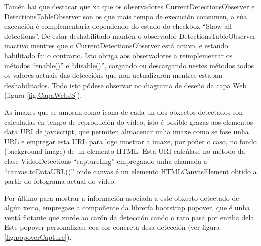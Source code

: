     Tamén hai que destacar que xa que os observadores CurrentDetectionsObserver e 
    DetectionsTableObserver son os que mais tempo de execución consumen, a súa execución é 
    complementaria dependendo do estado do checkbox ``Show all detections''. De estar
    deshabilitado mantén o observador DetectionsTableObserver inactivo mentres que o 
    CurrentDetectionsObserver está activo, e estando habilitado fai o contrario. Isto obriga aos
    observadores a reimplementar os métodos ``enable()'' e ``disable()'', cargando ou
    descargando nestes métodos todos os valores actuais das deteccións que non actualizaron mentres
    estaban deshabilitados. Todo isto pódese observar no diagrama de deseño da capa Web (figura 
    \ref{fig:CapaWebJS}).
    
    
    As imaxes que se amosan como icona de cada un dos obxectos detectados son calculadas en tempo de
    reprodución do vídeo, isto é posible grazas aos elementos data URI\cite{data-uris} de javascript,
    que permiten almacenar unha imaxe como se fose unha URL e empregar esta URL para logo mostrar a 
    imaxe, por poñer o caso, no fondo (background-image) de un elemento HTML. Esta URI calcúlase 
    no método da clase VideoDetections ``captureImg'' empregando unha chamada a ``canvas.toDataURL()''
    onde canvas é un elemento HTMLCanvasElement obtido a partir do fotograma actual do vídeo.
    
    Por último para mostrar a información asociada a este obxecto detectado de algún xeito, 
    empregase a compoñente da librería bootstrap popover, que é unha ventá flotante que xurde ao
    carón da detección cando o rato pasa por enriba dela. Este popover personalizase coa cor 
    concreta desa detección (ver figura \ref{fig:popoverCapture}).
    
